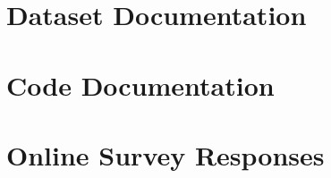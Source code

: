 \begin{appendices}
\cleardoublepage
\chapter{Dataset Documentation}
\label{app:dataset}
\cleardoublepage

\chapter{Code Documentation} 
\label{app:code}
\cleardoublepage

\chapter{Online Survey Responses}
\label{app:survey}
\cleardoublepage

\end{appendices}

